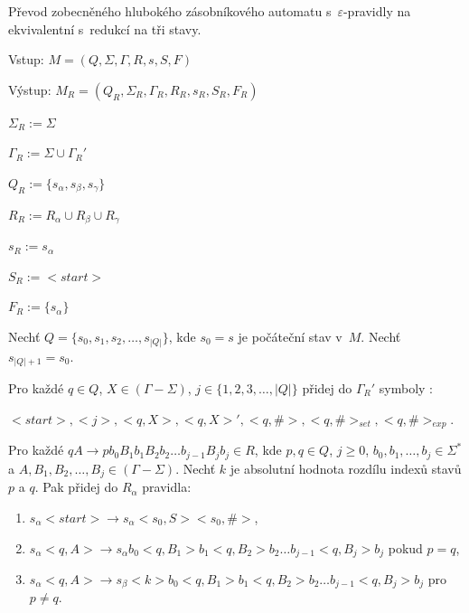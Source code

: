 \begin{Alg}\label{alg_gen_deep_pda_state}
Převod zobecněného hlubokého zásobníkového automatu s~$\varepsilon$-pravidly na ekvivalentní s~redukcí na tři stavy.

\begin{list}{}{\setlength\parsep{0cm} \setlength\itemsep{0cm} \setlength\leftmargin{1em}}
   \item Vstup: $M = (Q,\Sigma,\Gamma, R, s, S, F)$ 
   \item Výstup: $M_{R} = (Q_{R}, \Sigma_{R}, {\Gamma}_{R}, R_{R}, s_{R},  S_{R}, F_{R})$ \medskip

   \item ${\Sigma}_{R} := \Sigma$
   \item ${\Gamma}_{R} := \Sigma \cup {\Gamma}_{R}'$
   \item $Q_{R} := \{s_\alpha, s_\beta, s_\gamma \}$
   \item $R_{R} := R_{\alpha} \cup R_{\beta} \cup R_{\gamma}$
   \item $s_{R} := s_{\alpha} $
   \item $S_{R} := <start> $
   \item $F_{R} := \{s_{\alpha}\} $ \medskip

   \item Nechť $Q = \{s_0, s_1, s_2, \dots,s_{|Q|}\}$, kde $s_0 = s$ je počáteční stav v~$M$. Nechť $s_{|Q|+1} = s_0$.\medskip

   \item Pro každé $q \in Q$, $X \in (\Gamma - \Sigma)$, $j \in \{1,2,3,\dots,|Q|\}$ přidej do ${\Gamma}_{R}'$ symboly :
   \item $<start>, <j>, <q, X>, <q, X>', <q, \#>, <q, \#>_{set}, <q, \#>_{exp}$.\medskip

   \item Pro každé $qA \rightarrow p b_0 B_1 b_1 B_2 b_2 \dots b_{j-1} B_{j} b_j \in R$, kde $p, q \in Q$, $j \ge 0$, $b_0,b_1,\dots,b_j \in {\Sigma}^*$ a $A, B_1,B_2,\dots,B_j \in (\Gamma - \Sigma)$. 
         Nechť $k$ je absolutní hodnota rozdílu indexů stavů $p$ a $q$. 
         Pak přidej do $R_\alpha$ pravidla:

\begin{enumerate}
\renewcommand{\labelenumi}{(\roman{enumi})}

   \item $s_\alpha <start> \rightarrow s_\alpha <s_0, S> <s_0, \#>$,
   \item  $s_\alpha <q, A> \rightarrow s_\alpha b_0 <q, B_1> b_1 <q, B_2> b_2 \dots b_{j-1} <q, B_j> b_j$ pokud $p = q$,
   \item  $s_\alpha <q, A> \rightarrow s_\beta <k> b_0 <q, B_1> b_1 <q, B_2> b_2 \dots b_{j-1} <q, B_j> b_j$ pro $p \ne q$. 


\end{enumerate}
\end{list}
\end{Alg}
